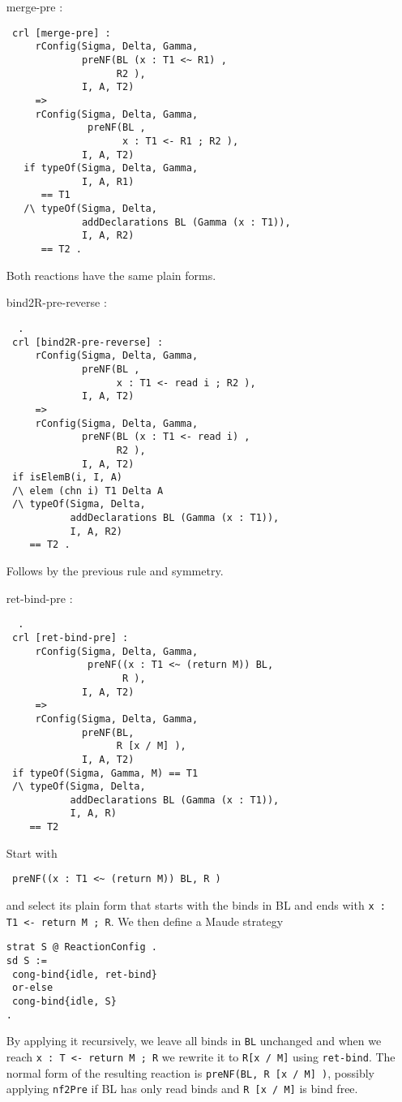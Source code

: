 \documentclass{article}
\begin{document}
\begin{itemize}
\item[merge-pre]:
\begin{lstlisting}
 crl [merge-pre] :
     rConfig(Sigma, Delta, Gamma, 
             preNF(BL (x : T1 <~ R1) , 
                   R2 ), 
             I, A, T2)
     =>
     rConfig(Sigma, Delta, Gamma, 
              preNF(BL , 
                    x : T1 <- R1 ; R2 ), 
             I, A, T2) 
   if typeOf(Sigma, Delta, Gamma, 
             I, A, R1) 
      == T1
   /\ typeOf(Sigma, Delta, 
             addDeclarations BL (Gamma (x : T1)), 
             I, A, R2) 
      == T2 .
       \end{lstlisting} 
       
 Both reactions have the same plain forms.      
  
\item[bind2R-pre-reverse]:
\begin{lstlisting}  .    
 crl [bind2R-pre-reverse] :
     rConfig(Sigma, Delta, Gamma, 
             preNF(BL , 
                   x : T1 <- read i ; R2 ), 
             I, A, T2)
     =>
     rConfig(Sigma, Delta, Gamma, 
             preNF(BL (x : T1 <- read i) , 
                   R2 ),
             I, A, T2) 
 if isElemB(i, I, A)  
 /\ elem (chn i) T1 Delta A 
 /\ typeOf(Sigma, Delta, 
           addDeclarations BL (Gamma (x : T1)), 
           I, A, R2) 
    == T2 .  
          \end{lstlisting} 
          
  Follows by the previous rule and symmetry.        
 
\item[ret-bind-pre]:
\begin{lstlisting}  .  
 crl [ret-bind-pre] :
     rConfig(Sigma, Delta, Gamma, 
              preNF((x : T1 <~ (return M)) BL, 
                    R ), 
             I, A, T2) 
     =>
     rConfig(Sigma, Delta, Gamma, 
             preNF(BL, 
                   R [x / M] ), 
             I, A, T2) 
 if typeOf(Sigma, Gamma, M) == T1 
 /\ typeOf(Sigma, Delta, 
           addDeclarations BL (Gamma (x : T1)), 
           I, A, R) 
    == T2 
          \end{lstlisting} 
 

 Start with 
  \begin{lstlisting}
 preNF((x : T1 <~ (return M)) BL, R )
 \end{lstlisting} 
 \noindent and select its 
 plain form that starts with the binds in BL and ends with \verb+x : T1 <- return M ; R+.
We then define a Maude strategy 
\begin{lstlisting}
strat S @ ReactionConfig .
sd S := 
 cong-bind{idle, ret-bind}
 or-else
 cong-bind{idle, S}
.
     \end{lstlisting}
By applying it recursively, we leave all binds in \verb+BL+ unchanged and 
when we reach
\verb+x : T <- return M ; R+ we rewrite it to \verb+R[x / M]+ 
using \verb+ret-bind+. 
The normal form of the resulting reaction is \verb+preNF(BL, R [x / M] )+, possibly applying \verb+nf2Pre+ if BL has only
read binds and \verb+R [x / M]+ is bind free.
 

\end{itemize}
\end{document}
